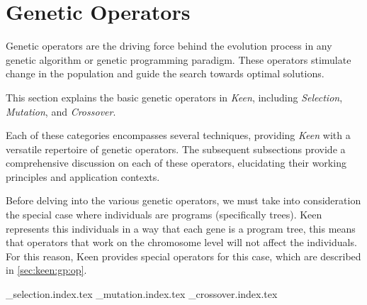 
\section{Genetic Operators}
\label{sec:keen:operators}
  Genetic operators are the driving force behind the evolution process in any genetic algorithm or genetic programming 
  paradigm. These operators stimulate change in the population and guide the search towards optimal solutions.
  

  This section explains the basic genetic operators in \textit{Keen}, including \textit{Selection}, \textit{Mutation}, 
  and \textit{Crossover}.

  Each of these categories encompasses several techniques, providing \textit{Keen} with a versatile repertoire of
  genetic operators. The subsequent subsections provide a comprehensive discussion on each of these operators, 
  elucidating their working principles and application contexts.
    
  Before delving into the various genetic operators, we must take into consideration the special case where individuals
  are programs (specifically trees). Keen represents this individuals in a way that each gene is a program tree, this
  means that operators that work on the chromosome level will not affect the individuals. For this reason, Keen provides
  special operators for this case, which are described in \vref{sec:keen:gp:op}.

  {_selection.index.tex}
  {_mutation.index.tex}
  {_crossover.index.tex}
